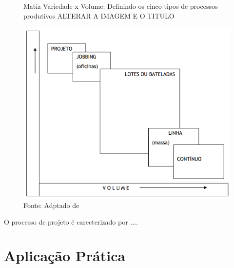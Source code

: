 \begin{figure}[H]
  \caption{Matiz Variedade x Volume: Definindo os cinco tipos de processos produtivos ALTERAR A IMAGEM E O TITULO}
  \includegraphics[scale=0.5]{images/tiposdeprocesso.png}
  \caption*{Fonte: Adptado de \cite{slack2009administracao}}
  \label{fig:tipos_de_processo_de_producao}
\end{figure}

O processo de projeto é carecterizado por ....

\section{Aplicação Prática}
\label{sec:tipos_de_processo_de_producao_aplicacao}